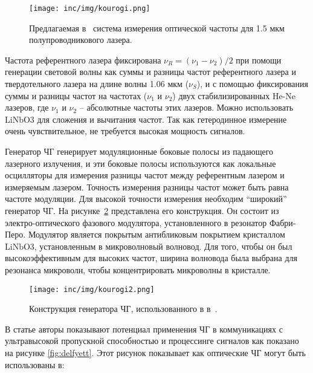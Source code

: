 \begin{figure}[ht]
  \centering
  \texttt{[image: inc/img/kourogi.png]}
  \caption{Предлагаемая в~\cite{Kourogi1993} система измерения оптической частоты для 1.5 мкм полупроводникового лазера.}
  \label{fig:kourogi}
\end{figure}

Частота референтного лазера фиксирована $\nu_R=(\nu_1 - \nu_2)/2$ при помощи генерации световой волны как суммы и разницы частот референтного лазера и твердотельного лазера на длине волны 1.06 мкм ($\nu_S$), и с помощью фиксирования суммы и разницы частот на частотах ($\nu_1$ и $\nu_2$) двух стабилизированных He-Ne лазеров, где $\nu_1$ и $\nu_2$ \--- абсолютные частоты этих лазеров. Можно использовать LiNbO3 для сложения и вычитания частот. Так как гетеродинное измерение очень чувствительное, не требуется высокая мощность сигналов.

Генератор ЧГ генерирует модуляционные боковые полосы из падающего лазерного излучения, и эти боковые полосы используются как локальные осцилляторы для измерения разницы частот между референтным лазером и измеряемым лазером. Точность измерения разницы частот может быть равна частоте модуляции. Для высокой точности измерения необходим ``широкий'' генератор ЧГ. На рисунке~\ref{fig:kourogi2} представлена его конструкция. Он состоит из электро-оптического фазового модулятора, установленного в резонатор Фабри-Перо. Модулятор является покрытым антибликовым покрытием кристаллом LiNbO3, установленным в микроволновый волновод. Для того, чтобы он был высокоэффективным для высоких частот, ширина волновода была выбрана для резонанса микроволн, чтобы концентрировать микроволны в кристалле. 

\begin{figure}[ht]
  \centering
  \texttt{[image: inc/img/kourogi2.png]}
  \caption{Конструкция генератора ЧГ, использованного в в~\cite{Kourogi1993}.}
  \label{fig:kourogi2}
\end{figure}

В статье \cite{Delfyett2006} авторы показывают потенциал применения ЧГ в коммуникациях с ультравысокой пропускной способностью и процессинге сигналов как показано на рисунке \ref{fig:delfyett}. Этот рисунок показывает как оптические ЧГ могут быть использованы в:

